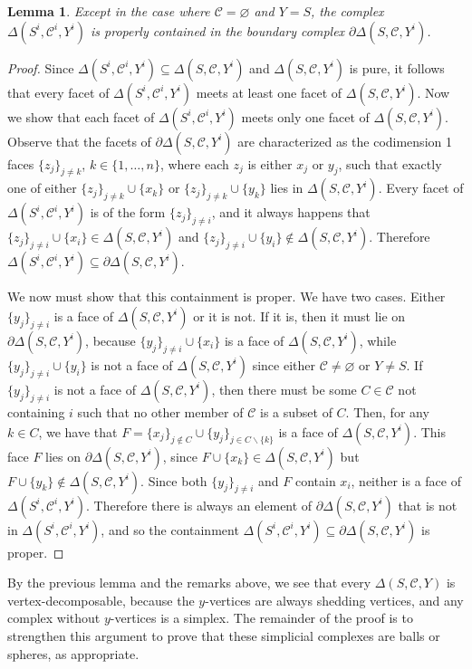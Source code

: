 \documentclass[10pt]{amsart}
\numberwithin{equation}{section}
\newtheorem{lem}[thm]{Lemma}
\theoremstyle{definition}
\theoremstyle{remark}
\newcommand{\sC}{\mathscr{C}}
\renewcommand{\emptyset}{\varnothing}
\newcommand{\dee}{\partial}
\newcommand{\1}{^{-1}}
\begin{document}
\begin{lem}\label{boundary}
Except in the case where $\sC = \emptyset$ and $Y=S$, the complex $\Delta(S^i,\sC^i,Y^i)$ is properly contained in the boundary complex $\dee \Delta(S,\sC,Y^i)$.
\end{lem}
\begin{proof}
Since $\Delta(S^i,\sC^i,Y^i) \subseteq \Delta(S,\sC,Y^i)$ and
$\Delta(S,\sC,Y^i)$ is pure, it follows that every facet of
$\Delta(S^i,\sC^i,Y^i)$ meets at least one facet of
$\Delta(S,\sC,Y^i)$. Now we show that each facet of
$\Delta(S^i,\sC^i,Y^i)$ meets only one facet of
$\Delta(S,\sC,Y^i)$. Observe that the facets of $\dee
\Delta(S,\sC,Y^i)$ are characterized as the codimension 1 faces
$\{z_j\}_{j \ne k}$, $k \in \{1,\dots,n\}$, where each $z_j$ is either
$x_j$ or $y_j$, such that exactly one of either $\{z_j\}_{j \ne k}
\cup \{x_k\}$ or $\{z_j\}_{j \ne k} \cup \{y_k\}$ lies in
$\Delta(S,\sC,Y^i)$. Every facet of $\Delta(S^i,\sC^i,Y^i)$ is of the
form $\{z_j\}_{j \ne i}$, and it always happens that $\{z_j\}_{j \ne
  i} \cup \{x_i\} \in \Delta(S,\sC,Y^i)$ and $\{z_j\}_{j \ne i} \cup
\{y_i\} \notin \Delta(S,\sC,Y^i)$. Therefore $\Delta(S^i,\sC^i,Y^i)
\subseteq \dee \Delta(S,\sC,Y^i)$.

We now must show that this containment is proper. We have two cases. Either $\{y_j\}_{j \ne i}$ is a face of $\Delta(S,\sC,Y^i)$ or it is not. If it is, then it must lie on $\dee \Delta(S,\sC,Y^i)$, because $\{y_j\}_{j \ne i} \cup \{x_i\}$ is a face of $\Delta(S,\sC,Y^i)$, while $\{y_j\}_{j \ne i} \cup \{y_i\}$ is not a face of $\Delta(S,\sC,Y^i)$ since either $\sC \ne \emptyset$ or $Y \ne S$. If $\{y_j\}_{j \ne i}$ is not a face of $\Delta(S,\sC,Y^i)$, then there must be some $C \in \sC$ not containing $i$ such that no other member of $\sC$ is a subset of $C$. Then, for any $k \in C$, we have that $F = \{x_j\}_{j \notin C} \cup \{y_j\}_{j \in C\smallsetminus\{k\}}$ is a face of $\Delta(S,\sC,Y^i)$. This face $F$ lies on $\dee \Delta(S,\sC,Y^i)$, since $F \cup \{x_k\} \in \Delta(S,\sC,Y^i)$ but $F \cup \{y_k\} \notin \Delta(S,\sC,Y^i)$. Since both $\{y_j\}_{j \ne i}$ and $F$ contain $x_i$, neither is a face of $\Delta(S^i,\sC^i,Y^i)$. Therefore there is always an element of $\dee \Delta(S,\sC,Y^i)$ that is not in $\Delta(S^i,\sC^i,Y^i)$, and so the containment $\Delta(S^i,\sC^i,Y^i) \subseteq \dee \Delta(S,\sC,Y^i)$ is proper.
\end{proof}
By the previous lemma and the remarks above, we see that every $\Delta(S,\sC,Y)$ is vertex-decomposable, because the $y$-vertices are always shedding vertices, and any complex without $y$-vertices is a simplex.  The remainder of the proof is to strengthen this argument to prove that these simplicial complexes are balls or spheres, as appropriate.
\end{document}
